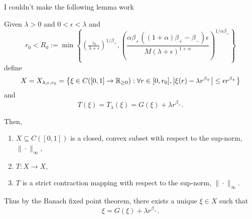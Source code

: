 \documentclass{amsart}
\begin{document}
{\color{red}I couldn't make the following lemma work}

\begin{lemma}
\label{lem:contraction}
Given \(\lambda > 0\) and \(0 < \epsilon < \lambda\) and
\begin{equation}
\label{eq:r_0}
r_0 < R_0 := \min\left\{\left(\tfrac{z_0}{\lambda + \epsilon}\right)^{1/\beta_+}, \left(\frac{\alpha\beta_+((1+\alpha)\beta_+ - \beta_-)\epsilon}{M (\lambda + \epsilon)^{1+\alpha}}\right)^{1/\alpha\beta_+}\right\}
\end{equation}
define
\begin{equation}
\label{eq:contraction_space}
X = X_{\lambda,\epsilon,r_0} = \left\{\xi \in C([0, 1] \to \mathbb{R}_{\geq 0}) : \forall r \in [0, r_0], \left|{\xi(r) - \lambda r^{\beta_+}}\right| \leq \epsilon r^{\beta_+} \right\}
\end{equation}
and
\begin{equation}
\label{eq:contraction_map}
T(\xi) = T_{\lambda} (\xi) = G(\xi) + \lambda r^{\beta_+}.
\end{equation}

Then,
\begin{enumerate}
\item \(X \subseteq C([0, 1])\) is a closed, convex subset with respect to the sup-norm, \(\|\cdot\|_{\infty}\), \label{itm:closed}
\item \(T : X \to X\), \label{itm:self_map}
\item \(T\) is a strict contraction mapping with respect to the sup-norm, \(\|\cdot\|_{\infty}\). \label{itm:contraction}
\end{enumerate}

Thus by the Banach fixed point theorem, there exists a unique \(\xi \in X\) such that
\[
\xi = G(\xi) + \lambda r^{\beta_+}.
\]
\end{lemma}
\end{document}
